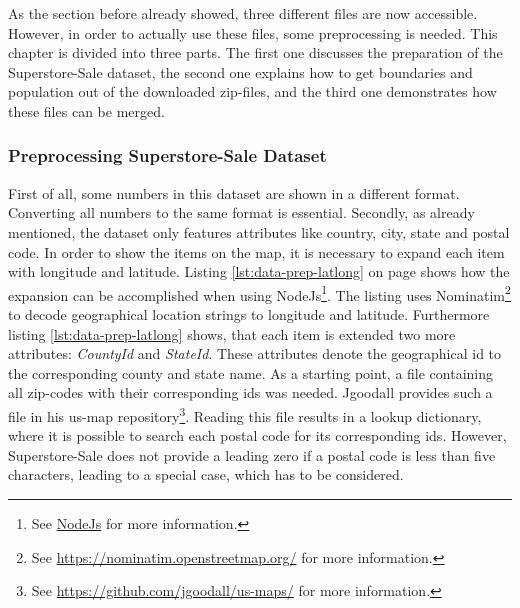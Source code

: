 As the section before already showed, three different files are now accessible. However, in order to actually use these files, some preprocessing is needed. This chapter is divided into three parts. The first one discusses the preparation of the Superstore-Sale dataset, the second one explains how to get boundaries and population out of the downloaded zip-files, and the third one demonstrates how these files can be merged.

\subsubsection{Preprocessing Superstore-Sale Dataset}
First of all, some numbers in this dataset are shown in a different format. Converting all numbers to the same format is essential.
Secondly, as already mentioned, the dataset only features attributes like country, city, state and postal code. In order to show the items on the map, it is necessary to expand each item with longitude and latitude. Listing \ref{lst:data-prep-latlong} on page \pageref{lst:data-prep-latlong} shows how the expansion can be accomplished when using NodeJs\footnote{See \href{https://nodejs.org/en/}{NodeJs} for more information.}. The listing uses Nominatim\footnote{See \href{https://nominatim.openstreetmap.org/}{https://nominatim.openstreetmap.org/} for more information.} to decode geographical location strings to longitude and latitude. Furthermore listing \ref{lst:data-prep-latlong} shows, that each item is extended two more attributes: \textit{CountyId} and \textit{StateId}. These attributes denote the geographical id to the corresponding county and state name. As a starting point, a file containing all zip-codes with their corresponding ids was needed. Jgoodall provides such a file in his us-map repository\footnote{See \href{https://github.com/jgoodall/us-maps/}{https://github.com/jgoodall/us-maps/} for more information.}. Reading this file results in a lookup dictionary, where it is possible to search each postal code for its corresponding ids. However, Superstore-Sale does not provide a leading zero if a postal code is less than five characters, leading to a special case, which has to be considered.

